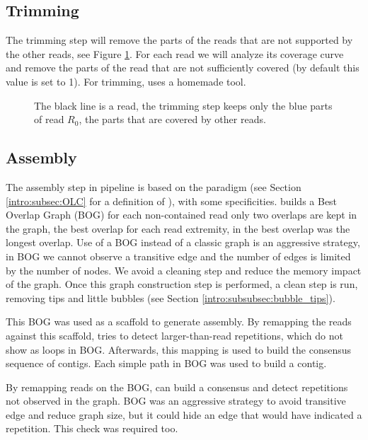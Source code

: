 \documentclass[main]{subfiles}
\begin{document}
\subsection{Trimming}

The trimming step will remove the parts of the reads that are not supported by the other reads, see Figure \ref{sota:fig:canu:trimming}. For each read we will analyze its coverage curve and remove the parts of the read that are not sufficiently covered (by default this value is set to 1). For trimming, \canu uses a homemade tool. 


\begin{figure}[ht]
    \centering
    
    \caption{The black line is a read, the \canu trimming step keeps only the blue parts of read $R_0$, the parts that are covered by other reads.}
    \label{sota:fig:canu:trimming}
\end{figure}

\subsection{Assembly}

The assembly step in \canu pipeline is based on the \OLC paradigm (see Section \ref{intro:subsec:OLC} for a definition of \OLC), with some specificities. \canu builds a Best Overlap Graph (BOG) for each non-contained read only two overlaps are kept in the graph, the best overlap for each read extremity, in \canu the best overlap was the longest overlap. Use of a BOG instead of a classic \OLC graph is an aggressive strategy, in BOG we cannot observe a transitive edge and the number of edges is limited by the number of nodes. We avoid a cleaning step and reduce the memory impact of the graph. Once this graph construction step is performed, a clean step is run, removing tips and little bubbles (see Section \ref{intro:subsubsec:bubble_tips}).

This BOG was used as a scaffold to generate assembly. By remapping the reads against this scaffold, \canu tries to detect larger-than-read repetitions, which do not show as loops in BOG. Afterwards, this mapping is used to build the consensus sequence of contigs. Each simple path in BOG was used to build a contig.

By remapping reads on the BOG, \canu can build a consensus and detect repetitions not observed in the graph. BOG was an aggressive strategy to avoid transitive edge and reduce graph size, but it could hide an edge that would have indicated a repetition. This check was required too.
\end{document}
